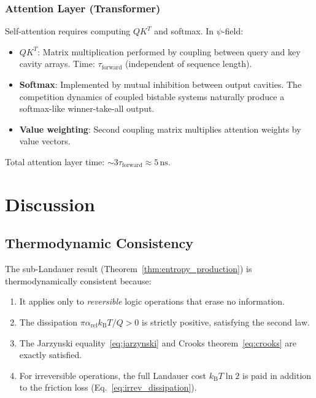 \documentclass[11pt,twocolumn]{article}
\theoremstyle{definition}
\theoremstyle{remark}
\newcommand{\kB}{k_{\mathrm{B}}}
\begin{document}
\subsubsection{Attention Layer (Transformer)}

Self-attention requires computing $QK^T$ and softmax. In $\psi$-field:
\begin{itemize}
\item \textbf{$QK^T$}: Matrix multiplication performed by coupling between
query and key cavity arrays. Time: $\tau_{\mathrm{forward}}$ (independent
of sequence length).
\item \textbf{Softmax}: Implemented by mutual inhibition between output
cavities. The competition dynamics of coupled bistable systems naturally
produce a softmax-like winner-take-all output.
\item \textbf{Value weighting}: Second coupling matrix multiplies
attention weights by value vectors.
\end{itemize}

Total attention layer time: $\sim 3\tau_{\mathrm{forward}} \approx
5\,\mathrm{ns}$.

\section{Discussion}\label{sec:discussion}

\subsection{Thermodynamic Consistency}

The sub-Landauer result (Theorem~\ref{thm:entropy_production}) is
thermodynamically consistent because:
\begin{enumerate}
\item It applies only to \emph{reversible} logic operations that erase
no information.
\item The dissipation $\pi\alpha_{\mathrm{rel}}\kB T/Q > 0$ is strictly
positive, satisfying the second law.
\item The Jarzynski equality~\eqref{eq:jarzynski} and Crooks
theorem~\eqref{eq:crooks} are exactly satisfied.
\item For irreversible operations, the full Landauer cost
$\kB T\ln 2$ is paid in addition to the friction loss
(Eq.~\ref{eq:irrev_dissipation}).
\end{enumerate}
\end{document}
